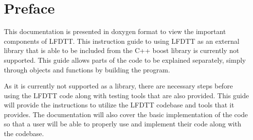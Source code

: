 \hypertarget{index_intro_sec}{}\section{Preface}\label{index_intro_sec}
This documentation is presented in doxygen format to view the important components of L\+F\+D\+TT. This instruction guide to using L\+F\+D\+TT as an external library that is able to be included from the C++ boost library is currently not supported. This guide allows parts of the code to be explained separately, simply through objects and functions by building the program.

As it is currently not supported as a library, there are necessary steps before using the L\+F\+D\+TT code along with testing tools that are also provided. This guide will provide the instructions to utilize the L\+F\+D\+TT codebase and tools that it provides. The documentation will also cover the basic implementation of the code so that a user will be able to properly use and implement their code along with the codebase.

